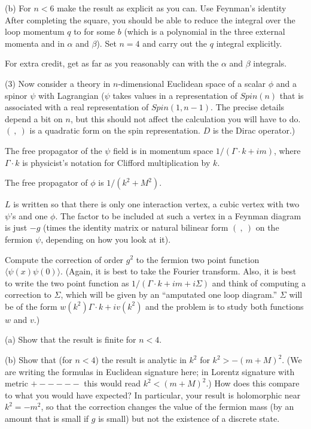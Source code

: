 (b) For $n<6$ make the result as explicit as you can.
Use Feynman's identity
\eqn{}
After completing the square, you should be able to reduce the
integral over the loop momentum $q$ to
\eqn{}
for some $b$ (which is a polynomial in the three external momenta
and in $\alpha$ and $\beta$).
Set $n=4$ and carry out the $q$ integral explicitly.

For extra credit, get as far as you reasonably can with the $\alpha$
and $\beta$ integrals.

(3) Now consider a theory in $n$-dimensional Euclidean space
of a scalar $\phi$ and a spinor $\psi$ with Lagrangian
\eqn{}
($\psi$ takes values in a representation of $Spin(n)$ that
is associated with a real representation of $Spin(1,n-1)$.  The
precise details depend a bit on $n$, but this should not
affect the calculation you will have to do. $(~,~)$ is a quadratic
form on the spin representation. $D$ is the Dirac operator.)

The free propagator of the $\psi$ field is
in momentum space $1/(\Gamma\cdot k+im)$, where $\Gamma\cdot k$
is physicist's notation for Clifford multiplication by $k$.  


The free propagator of $\phi$ is $1/(k^2+M^2)$.

$L$ is written so that there is only one interaction vertex,
a cubic vertex with two $\psi$'s and one $\phi$.
The factor to be included at such a vertex in  a Feynman
diagram is just $-g$ (times the identity matrix or natural
bilinear form $(~,~)$ on the fermion $\psi$, depending on how you
look at it).

Compute the correction of order $g^2$ to the fermion
two point function $\langle \psi(x) \psi(0)\rangle$.  (Again,
it is best to take the Fourier transform.  Also, it is best
to write the two point function as $1/(\Gamma\cdot k+im+i\Sigma)$
and think of computing a correction to $\Sigma$, which will
be given by an ``amputated one loop diagram.''  $\Sigma$
will be of the form $w(k^2) \Gamma\cdot k +iv(k^2)$ and the problem
is to study both functions $w$ and $v$.)  

(a) Show that the result is finite for $n<4$. 

(b) Show
that (for $n<4$) the result is analytic in $k^2$ for $k^2>-(m+M)^2$.
(We are writing the formulas in Euclidean signature here;
in Lorentz signature with metric $+-----$ this would
read $k^2<(m+M)^2$.)  How does this compare to what you would
have expected?  In particular, your result is holomorphic
near $k^2=-m^2$, so that the correction changes the value
of the fermion mass (by an amount that is small if $g$ is small)
but not the existence of a discrete state.


